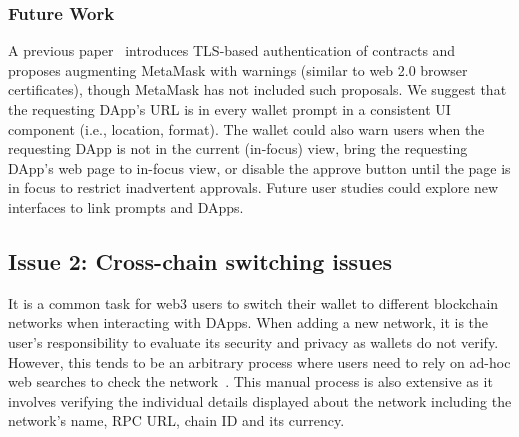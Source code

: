 \documentclass[conference]{IEEEtran}
\begin{document}
\subsubsection*{\textbf{Future Work}}
A previous paper~\cite{gallersdorfer2021augmenting} introduces TLS-based authentication of contracts and proposes augmenting MetaMask with warnings (similar to web 2.0 browser certificates), though MetaMask has not included such proposals.
We suggest that the requesting DApp's URL is in every wallet prompt in a consistent UI component (i.e., location, format).
The wallet could also warn users when the requesting DApp is not in the current (in-focus) view, bring the requesting DApp's web page to in-focus view, or disable the approve button until the page is in focus to restrict inadvertent approvals.
Future user studies could explore new interfaces to link prompts and DApps.


\subsection{Issue 2: Cross-chain switching issues}
It is a common task for web3 users to switch their wallet to different blockchain networks when interacting with DApps.
When adding a new network, it is the user's responsibility to evaluate its security and privacy as wallets do not verify. %
However, this tends to be an arbitrary process where users need to rely on ad-hoc web searches to check the network~\cite{metamaskVerifyNetwork, coinbaseCustomNetwork}.
This manual process is also extensive as it involves verifying the individual details displayed about the network including the network's name, \ac*{RPC} URL, chain ID and its currency.
\end{document}
